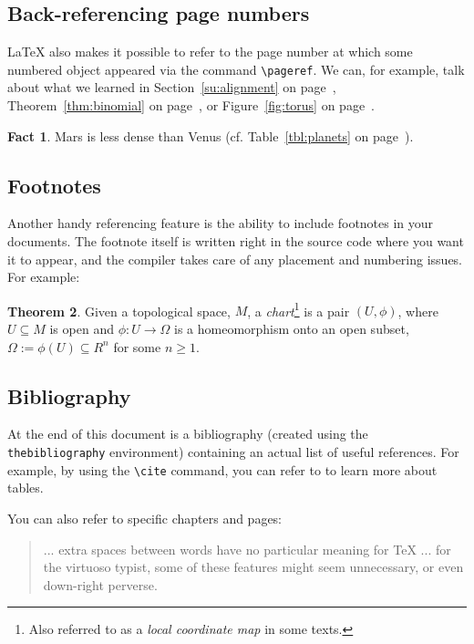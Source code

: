 \documentclass[11pt,letterpaper,titlepage]{article}
\numberwithin{equation}{section}
\numberwithin{figure}{section}
\numberwithin{table}{section}
\numberwithin{algorithm}{section}
\theoremstyle{definition}
\newtheorem{theorem}{Theorem}[section] %
\newtheorem{fact}[theorem]{Fact} %
\begin{document}
\subsection{Back-referencing page numbers}
{\LaTeX} also makes it possible to refer to the page number at which some numbered object appeared via the command \verb$\pageref$. We can, for example, talk about what we learned in Section~\ref{su:alignment} on page~\pageref{su:alignment}, Theorem~\ref{thm:binomial} on page~\pageref{thm:binomial}, or Figure~\ref{fig:torus} on page~\pageref{fig:torus}.

\begin{fact}
    Mars is less dense than Venus (cf. Table~\ref{tbl:planets} on page~\pageref{tbl:planets}).
\end{fact}
  
\subsection{Footnotes}

Another handy referencing feature is the ability to include footnotes in your documents. The footnote itself is written right in the source code where you want it to appear, and the compiler takes care of any placement and numbering issues. For example:

\begin{theorem}
Given a topological space, $M$, a \textit{chart}\footnote{\label{myFootnoteName}Also referred to as a \textit{local coordinate map} in some texts.} is a pair $(U, \phi)$, where $U \subseteq M$ is open and $\phi: U \rightarrow \Omega$ is a homeomorphism
onto an open subset, $\Omega := \phi(U) \subseteq R^n$ for some $n \geq 1$.
\end{theorem}


\subsection{Bibliography}
At the end of this document is a bibliography (created using the \verb$thebibliography$ environment) containing an actual list of useful references. For example, by using the \verb$\cite$ command, you can refer to \cite{tables} to learn more about tables. 

You can also refer to specific chapters and pages:

\begin{quote}
... extra spaces between words have no particular meaning for {\TeX} ... for the virtuoso typist, some of these features might seem unnecessary, or even down-right perverse. \cite[chapter 1, p.~7]{joyoftex}
\end{quote}
  
\end{document}
